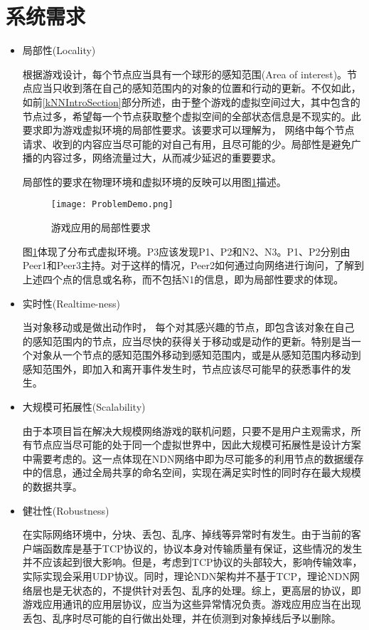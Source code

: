 \section{系统需求}
\begin{itemize}
\item
局部性(Locality)
\par
根据游戏设计，每个节点应当具有一个球形的感知范围(Area of interest)。节点应当只收到落在自己的感知范围内的对象的位置和行动的更新。不仅如此，如前\ref{kNNIntroSection}部分所述，由于整个游戏的虚拟空间过大，其中包含的节点过多，希望每一个节点获取整个虚拟空间的全部状态信息是不现实的。此要求即为游戏虚拟环境的局部性要求。该要求可以理解为， 网络中每个节点请求、收到的内容应当尽可能的对自己有用，且尽可能的少。局部性是避免广播的内容过多，网络流量过大，从而减少延迟的重要要求。
\par
局部性的要求在物理环境和虚拟环境的反映可以用图\ref{fig:Locality}描述。
\begin{figure}[h!]
	\centering
	\texttt{[image: ProblemDemo.png]}
	\caption{游戏应用的局部性要求}
	\label{fig:Locality}
\end{figure}
\par
图\ref{fig:Locality}体现了分布式虚拟环境。P3应该发现P1、P2和N2、N3。P1、P2分别由Peer1和Peer3主持。对于这样的情况，Peer2如何通过向网络进行询问，了解到上述四个点的信息或名称，而不包括N1的信息，即为局部性要求的体现。
\item
实时性(Realtime-ness)
\par
当对象移动或是做出动作时， 每个对其感兴趣的节点，即包含该对象在自己的感知范围内的节点，应当尽快的获得关于移动或是动作的更新。特别是当一个对象从一个节点的感知范围外移动到感知范围内，或是从感知范围内移动到感知范围外，即加入和离开事件发生时，节点应该尽可能早的获悉事件的发生。
\item
大规模可拓展性(Scalability)
\par
由于本项目旨在解决大规模网络游戏的联机问题，只要不是用户主观需求，所有节点应当尽可能的处于同一个虚拟世界中，因此大规模可拓展性是设计方案中需要考虑的。这一点体现在NDN网络中即为尽可能多的利用节点的数据缓存中的信息，通过全局共享的命名空间，实现在满足实时性的同时存在最大规模的数据共享。
\item
健壮性(Robustness)
\par
在实际网络环境中，分块、丢包、乱序、掉线等异常时有发生。由于当前的客户端函数库是基于TCP协议的，协议本身对传输质量有保证，这些情况的发生并不应该起到很大影响。但是，考虑到TCP协议的头部较大，影响传输效率，实际实现会采用UDP协议。同时，理论NDN架构并不基于TCP，理论NDN网络层也是无状态的，不提供针对丢包、乱序的处理。综上，更高层的协议，即游戏应用通讯的应用层协议，应当为这些异常情况负责。游戏应用应当在出现丢包、乱序时尽可能的自行做出处理，并在侦测到对象掉线后予以删除。
\end{itemize}
